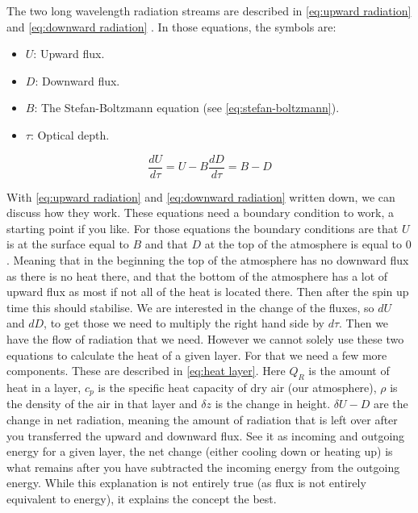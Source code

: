 The two long wavelength radiation streams are described in \autoref{eq:upward radiation} and \autoref{eq:downward radiation} \cite{greyRad}. In those equations, the symbols are:

\begin{itemize}
    \item $U$: Upward flux.
    \item $D$: Downward flux.
    \item $B$: The Stefan-Boltzmann equation (see \autoref{eq:stefan-boltzmann}).
    \item $\tau$: Optical depth.
\end{itemize}

\begin{subequations}
    \begin{equation}
        \frac{dU}{d\tau} = U - B
        \label{eq:upward radiation}
    \end{equation}
    \begin{equation}
        \frac{dD}{d\tau} = B - D
        \label{eq:downward radiation}
    \end{equation}
\end{subequations}

With \autoref{eq:upward radiation} and \autoref{eq:downward radiation} written down, we can discuss how they work. These equations need a boundary condition to work, a starting point if you like.
For those equations the boundary conditions are that $U$ is at the surface equal to $B$ and that $D$ at the top of the atmosphere is equal to $0$. Meaning that in the beginning the top of the 
atmosphere has no downward flux as there is no heat there, and that the bottom of the atmosphere has a lot of upward flux as most if not all of the heat is located there. Then after the spin up 
time this should stabilise. We are interested in the change of the fluxes, so $dU$ and $dD$, to get those we need to multiply the right hand side by $d\tau$. Then we have the flow of radiation
that we need. However we cannot solely use these two equations to calculate the heat of a given layer. For that we need a few more components. These are described in \autoref{eq:heat layer}. 
Here $Q_R$ is the amount of heat in a layer, $c_p$ is the specific heat capacity of dry air (our atmosphere), $\rho$ is the density of the air in that layer and $\delta z$ is the change in height. 
$\delta U - D$ are the change in net radiation, meaning the amount of radiation that is left over after you transferred the upward and downward flux. See it as incoming and outgoing energy for a 
given layer, the net change (either cooling down or heating up) is what remains after you have subtracted the incoming energy from the outgoing energy. While this explanation is not entirely true 
(as flux is not entirely equivalent to energy), it explains the concept the best.

